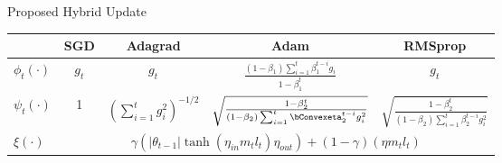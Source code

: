 \begin{frame}{Proposed Hybrid Update}
	\begin{table}
    \renewcommand{\arraystretch}{3.5}
    \begin{tabularx}{\linewidth}{l|c|c|c|c}
      & \textbf{SGD} & \textbf{Adagrad} & \textbf{Adam} & \textbf{RMSprop} \\
      \hline
      \(\phi_{t}(\cdot)\) & \(g_t\) & \(g_t\) &
                                                          \(\frac{(1-\beta_1)\sum_{i=1}^t\beta_1^{t-i}g_i}{1-\beta_1^t}\)
                                                          &  \(g_t\) \\ \hline
      \(\psi_{t}(\cdot)\)    & 1  & \( \left( \sum_{i=1}^{t}g_i^2 \right)^{-1/2}\) &
                                                                 \(\sqrt{\frac{1-\beta_2^t}{(1-\beta_2)\sum_{i=1}^{t}\bConvexeta_2^{t-i}g_i^2}}\)
                                                          &
                                                            \(\sqrt{\frac{1-\beta_2^t}{(1-\beta_2)\sum_{i=1}^{t}\beta_2^{t-i}g_i^2}}\)\\ \hline
      \(\xi(\cdot)\) & \multicolumn{4}{c}{\cellcolor{blue!25} \(\gamma\left(|\theta_{t-1}|\tanh{\left(\eta_{in} m_t l_t \right)}\eta_{out}\right) + (1-\gamma) \left(\eta m_t l_t\right)\)}
                                                                                                                                              
    \end{tabularx}
  \end{table}
\end{frame}

